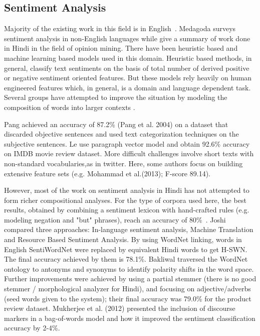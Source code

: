 \documentclass[11pt,a4paper]{article}
\begin{document}
\subsection{Sentiment Analysis}
Majority of the existing work in this field is in English~\cite{Liu:12}. Medagoda surveys sentiment analysis in non-English languages while \cite{Sharma:14} give a summary of work done in Hindi in the field of opinion mining.
There have been heuristic based and machine learning based models used in this domain. Heuristic based methods, in general, classify text sentiments on the basis of total number of derived positive or negative sentiment oriented features. But these models rely heavily on human engineered features which, in general, is a domain and language dependent task. Several groups have attempted to improve the situation by modeling the composition of words into larger contexts \cite{Le:14,Socher:13,Johnson:14,Baroni:14}.

Pang achieved an accuracy of 87.2\% (Pang et al. 2004) on a dataset that discarded objective sentences and used text categorization techniques on the subjective sentences. Le use paragraph vector model and obtain 92.6\% accuracy on IMDB movie review dataset.  More difficult challenges involve short texts with non-standard vocabularies,as in twitter.  Here, some authors focus on building extensive feature sets (e.g. Mohammad et al.(2013); F-score 89.14).

However, most of the work on sentiment analysis in Hindi has not attempted to form richer compositional analyses. For the type of corpora used here, the best results, obtained by combining a sentiment lexicon with hand-crafted rules (e.g. modeling negation and "but" phrases), reach an accuracy of 80\%~\cite{Mittal:13}. Joshi compared three approaches: In-language sentiment
analysis, Machine Translation and Resource Based Sentiment Analysis. By using WordNet linking, words in English SentiWordNet were replaced by equivalent Hindi words to get H-SWN. The final accuracy achieved by them is 78.1\%. Bakliwal traversed the WordNet ontology to antonyms and synonyms to identify polarity shifts in the word space. Further improvements were achieved by using a partial stemmer (there is no good stemmer / morphological analyzer for Hindi), and focusing on adjective/adverbs (seed words given to the system); their final accuracy was 79.0\% for the product review dataset. Mukherjee et al. (2012) presented the inclusion of discourse markers in a bag-of-words model and how it improved the sentiment classification accuracy by 2-4\%.
\end{document}
